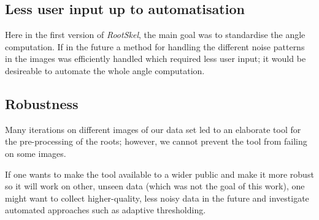 \subsection{Less user input up to automatisation}

Here in the first version of \textit{RootSkel}, the main goal was to standardise the angle computation. If in the future  a method for handling the different noise patterns in the images was efficiently handled which required less user input; it would be desireable to automate the whole angle computation.

 

\subsection{Robustness}



Many iterations on different images of our data set led to an elaborate tool for the pre-processing of the roots; however, we cannot prevent the tool from failing on some images. 

If one wants to make the tool available to a wider public and make it more robust so it will work on other, unseen data (which was not the goal of this work), one might want to collect higher-quality, less noisy data in the future and investigate automated approaches such as adaptive thresholding. 






